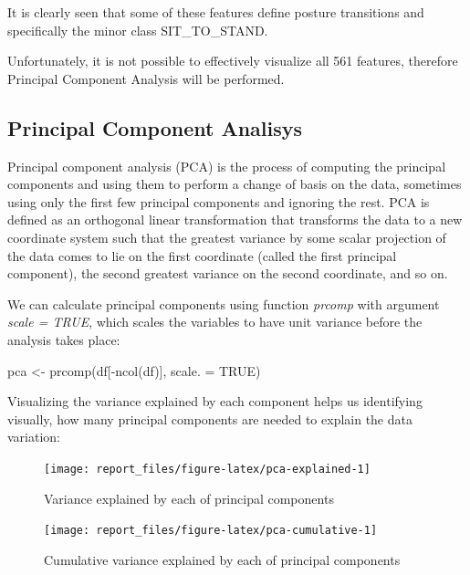 \documentclass[
]{article}
\newenvironment{Shaded}{\begin{snugshade}}{\end{snugshade}}
\newcommand{\AttributeTok}[1]{\textcolor[rgb]{0.77,0.63,0.00}{#1}}
\newcommand{\ConstantTok}[1]{\textcolor[rgb]{0.00,0.00,0.00}{#1}}
\newcommand{\FunctionTok}[1]{\textcolor[rgb]{0.00,0.00,0.00}{#1}}
\newcommand{\NormalTok}[1]{#1}
\newcommand{\OtherTok}[1]{\textcolor[rgb]{0.56,0.35,0.01}{#1}}
\newcommand{\SpecialCharTok}[1]{\textcolor[rgb]{0.00,0.00,0.00}{#1}}
\begin{document}
It is clearly seen that some of these features define posture
transitions and specifically the minor class SIT\_TO\_STAND.

Unfortunately, it is not possible to effectively visualize all 561
features, therefore Principal Component Analysis will be performed.

\hypertarget{principal-component-analisys}{%
\subsection{Principal Component
Analisys}\label{principal-component-analisys}}

Principal component analysis (PCA) is the process of computing the
principal components and using them to perform a change of basis on the
data, sometimes using only the first few principal components and
ignoring the rest. PCA is defined as an orthogonal linear transformation
that transforms the data to a new coordinate system such that the
greatest variance by some scalar projection of the data comes to lie on
the first coordinate (called the first principal component), the second
greatest variance on the second coordinate, and so on.

We can calculate principal components using function \emph{prcomp} with
argument \emph{scale = TRUE}, which scales the variables to have unit
variance before the analysis takes place:

\begin{Shaded}
\begin{Highlighting}[]
\NormalTok{pca }\OtherTok{\textless{}{-}} \FunctionTok{prcomp}\NormalTok{(df[}\SpecialCharTok{{-}}\FunctionTok{ncol}\NormalTok{(df)], }\AttributeTok{scale. =} \ConstantTok{TRUE}\NormalTok{)}
\end{Highlighting}
\end{Shaded}

Visualizing the variance explained by each component helps us
identifying visually, how many principal components are needed to
explain the data variation:

\begin{figure}

{\centering \texttt{[image: report\_files/figure-latex/pca-explained-1]} 

}

\caption{Variance explained by each of principal components}\label{fig:pca-explained}
\end{figure}
\begin{figure}

{\centering \texttt{[image: report\_files/figure-latex/pca-cumulative-1]} 

}

\caption{Cumulative variance explained by each of principal components}\label{fig:pca-cumulative}
\end{figure}
\end{document}
